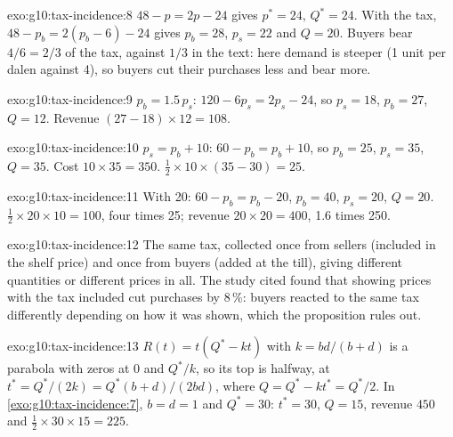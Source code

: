 \begin{solution}{exo:g10:tax-incidence:8}
$48 - p = 2p - 24$ gives $p^* = 24$, $Q^* = 24$. With the tax, $48 - p_b = 2(p_b - 6) - 24$ gives $p_b = 28$, $p_s = 22$ and $Q = 20$. Buyers bear $4/6 = 2/3$ of the tax, against $1/3$ in
the text: here demand is steeper (1 unit per dalen against 4), so buyers cut their purchases less and bear more.
\end{solution}

\begin{solution}{exo:g10:tax-incidence:9}
$p_b = 1.5\,p_s$: $120 - 6p_s = 2p_s - 24$, so $p_s = 18$, $p_b = 27$, $Q = 12$. Revenue $(27 - 18) \times 12 = 108$.
\end{solution}

\begin{solution}{exo:g10:tax-incidence:10}
$p_s = p_b + 10$: $60 - p_b = p_b + 10$, so $p_b = 25$, $p_s = 35$, $Q = 35$. Cost $10 \times 35 = 350$.  $\tfrac12 \times 10 \times (35 - 30) = 25$.
\end{solution}

\begin{solution}{exo:g10:tax-incidence:11}
With 20: $60 - p_b = p_b - 20$, $p_b = 40$, $p_s = 20$, $Q = 20$.  $\tfrac12 \times 20 \times 10 = 100$, four times 25; revenue $20 \times 20 = 400$, 1.6 times 250.
\end{solution}

\begin{solution}{exo:g10:tax-incidence:12}
The same tax, collected once from sellers (included in the shelf price) and once from buyers (added at the till), giving different quantities or different prices in all. The study cited
found that showing prices with the tax included cut purchases by 8\,\%: buyers reacted to the same tax differently depending on how it was shown, which the proposition rules out.
\end{solution}

\begin{solution}{exo:g10:tax-incidence:13}
$R(t) = t(Q^* - kt)$ with $k = bd/(b + d)$ is a parabola with zeros at $0$ and $Q^*/k$, so its top is halfway, at $t^* = Q^*/(2k) = Q^*(b + d)/(2bd)$, where $Q = Q^* - kt^* = Q^*/2$. In
\cref{exo:g10:tax-incidence:7}, $b = d = 1$ and $Q^* = 30$: $t^* = 30$, $Q = 15$, revenue $450$ and  $\tfrac12 \times 30 \times 15 = 225$.
\end{solution}

